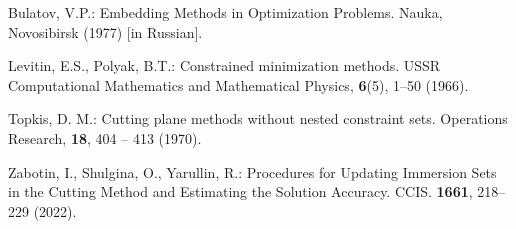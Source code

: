 \documentclass[12pt]{llncs}
\begin{document}
\begin{thebibliography}{9} %
 Bulatov, V.P.: Embedding Methods in Optimization Problems. Nauka, Novosibirsk (1977) [in Russian]. 
 
Levitin, E.S., Polyak, B.T.: Constrained minimization methods. USSR Computational Mathematics and Mathematical Physics, \textbf{6}(5), 1--50 (1966).

 Topkis, D. M.: Cutting plane methods without nested constraint sets. Operations Research, \textbf{18}, 404 -- 413 (1970).

Zabotin, I., Shulgina, O., Yarullin, R.: Procedures for Updating Immersion Sets in the Cutting Method and Estimating the Solution Accuracy. CCIS. \textbf{1661}, 218--229 (2022).

\end{thebibliography}
\end{document}
